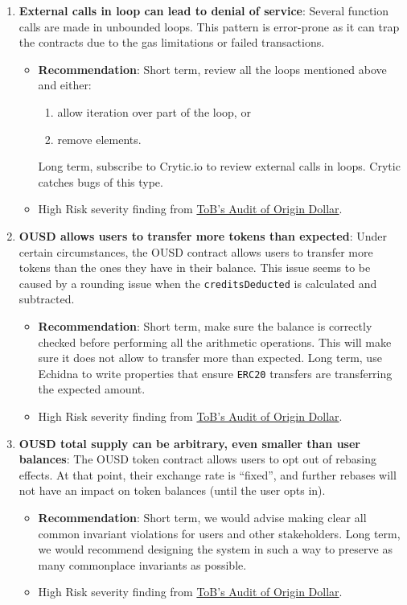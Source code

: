 \begin{enumerate}
\item\textbf{External calls in loop can lead to denial of service}: Several function calls are made in unbounded loops. This pattern is error-prone as it can trap the contracts due to the gas limitations or failed transactions.
	\begin{itemize}
	\item\textbf{Recommendation}: Short term, review all the loops mentioned above and either:
	\begin{enumerate}
	\item allow iteration over part of the loop, or
	\item remove elements.
	\end{enumerate}
	Long term, subscribe to Crytic.io to review external calls in loops. Crytic catches bugs of this type.
	\item High Risk severity finding from \href{https://github.com/trailofbits/publications/blob/master/reviews/OriginDollar.pdf}{ToB’s Audit of Origin Dollar}.
	\end{itemize}

\item\textbf{OUSD allows users to transfer more tokens than expected}: Under certain circumstances, the OUSD contract allows users to transfer more tokens than the ones they have in their balance. This issue seems to be caused by a rounding issue when the \verb|creditsDeducted| is calculated and subtracted.
	\begin{itemize}
	\item\textbf{Recommendation}: Short term, make sure the balance is correctly checked before performing all the arithmetic operations. This will make sure it does not allow to transfer more than expected. Long term, use Echidna to write properties that ensure \verb|ERC20| transfers are transferring the expected amount.
	\item High Risk severity finding from \href{https://github.com/trailofbits/publications/blob/master/reviews/OriginDollar.pdf}{ToB’s Audit of Origin Dollar}.
	\end{itemize}

\item\textbf{OUSD total supply can be arbitrary, even smaller than user balances}: The OUSD token contract allows users to opt out of rebasing effects. At that point, their exchange rate is “fixed”, and further rebases will not have an impact on token balances (until the user opts in).
	\begin{itemize}
	\item\textbf{Recommendation}: Short term, we would advise making clear all common invariant violations for users and other stakeholders. Long term, we would recommend designing the system in such a way to preserve as many commonplace invariants as possible.
	\item High Risk severity finding from \href{https://github.com/trailofbits/publications/blob/master/reviews/OriginDollar.pdf}{ToB’s Audit of Origin Dollar}.
    \end{itemize}


\end{enumerate}
